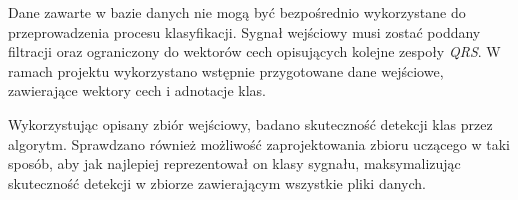 Dane zawarte w bazie danych nie mogą być bezpośrednio wykorzystane do przeprowadzenia procesu klasyfikacji. Sygnał wejściowy musi zostać poddany filtracji oraz ograniczony do wektorów cech opisujących kolejne zespoły \textit{QRS}. W ramach projektu wykorzystano wstępnie przygotowane dane wejściowe, zawierające wektory cech i adnotacje klas.

Wykorzystując opisany zbiór wejściowy, badano skuteczność detekcji klas przez algorytm. Sprawdzano również możliwość zaprojektowania zbioru uczącego w taki sposób, aby jak najlepiej reprezentował on klasy sygnału, maksymalizując skuteczność detekcji w zbiorze zawierającym wszystkie pliki danych.